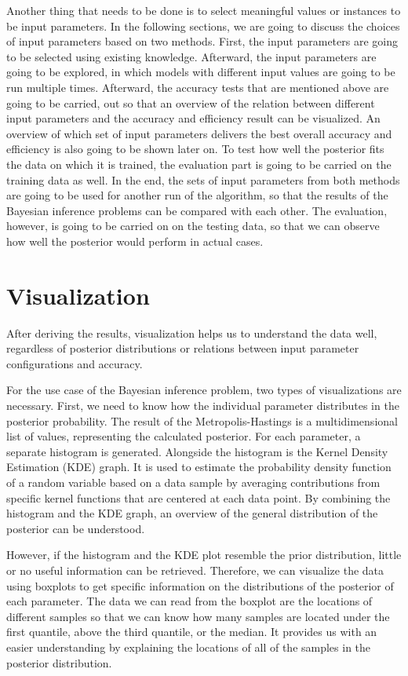 Another thing that needs to be done is to select meaningful values or instances to be input parameters. In the following sections, we are going to discuss the choices of input parameters based on two methods. First, the input parameters are going to be selected using existing knowledge. Afterward, the input parameters are going to be explored, in which models with different input values are going to be run multiple times. Afterward, the accuracy tests that are mentioned above are going to be carried, out so that an overview of the relation between different input parameters and the accuracy and efficiency result can be visualized. An overview of which set of input parameters delivers the best overall accuracy and efficiency is also going to be shown later on. To test how well the posterior fits the data on which it is trained, the evaluation part is going to be carried on the training data as well. In the end, the sets of input parameters from both methods are going to be used for another run of the algorithm, so that the results of the Bayesian inference problems can be compared with each other. The evaluation, however, is going to be carried on on the testing data, so that we can observe how well the posterior would perform in actual cases.

\section{Visualization}
After deriving the results, visualization helps us to understand the data well, regardless of posterior distributions or relations between input parameter configurations and accuracy. 

For the use case of the Bayesian inference problem, two types of visualizations are necessary. First, we need to know how the individual parameter distributes in the posterior probability. The result of the Metropolis-Hastings is a multidimensional list of values, representing the calculated posterior. For each parameter, a separate histogram is generated. Alongside the histogram is the Kernel Density Estimation (KDE) graph. It is used to estimate the probability density function of a random variable based on a data sample by averaging contributions from specific kernel functions that are centered at each data point.\cite{kde} By combining the histogram and the KDE graph, an overview of the general distribution of the posterior can be understood.

However, if the histogram and the KDE plot resemble the prior distribution, little or no useful information can be retrieved. Therefore, we can visualize the data using boxplots to get specific information on the distributions of the posterior of each parameter. The data we can read from the boxplot are the locations of different samples so that we can know how many samples are located under the first quantile, above the third quantile, or the median. It provides us with an easier understanding by explaining the locations of all of the samples in the posterior distribution.

